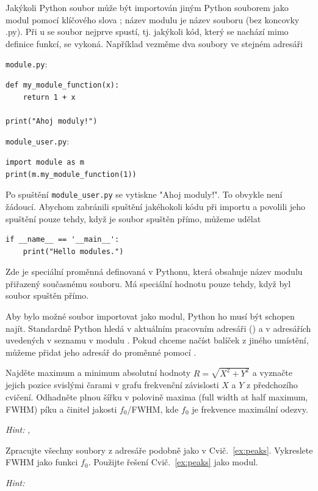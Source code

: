 \begin{syntax}
    Jakýkoli Python soubor může být importován jiným Python souborem jako modul pomocí klíčového slova ; název modulu je název souboru (bez koncovky .py). Při u se soubor nejprve spustí, tj. jakýkoli kód, který se nachází mimo definice funkcí, se vykoná. Například vezměme dva soubory ve stejném adresáři

    \verb|module.py|:
\begin{lstlisting}
def my_module_function(x):
    return 1 + x

print("Ahoj moduly!")
\end{lstlisting}

    \verb|module_user.py|:
\begin{lstlisting}
import module as m
print(m.my_module_function(1))
\end{lstlisting}

    Po spuštění \verb|module_user.py| se vytiskne "Ahoj moduly!". To obvykle není žádoucí. Abychom zabránili spuštění jakéhokoli kódu při importu a povolili jeho spuštění pouze tehdy, když je soubor spuštěn přímo, můžeme udělat
\begin{lstlisting}
if __name__ == '__main__':
    print("Hello modules.")
\end{lstlisting}
    Zde je  speciální proměnná definovaná v Pythonu, která obsahuje název modulu přiřazený současnému souboru. Má speciální hodnotu  pouze tehdy, když byl soubor spuštěn přímo.

    Aby bylo možné soubor importovat jako modul, Python ho musí být schopen najít. Standardně Python hledá v aktuálním pracovním adresáři () a v adresářích uvedených v seznamu  v modulu . Pokud chceme načíst balíček z jiného umístění, můžeme přidat jeho adresář do proměnné  pomocí .
\end{syntax}
\begin{exercise}
    \label{ex:peaks}
    Najděte maximum a minimum absolutní hodnoty $R = \sqrt{X^2 + Y^2}$ a vyznačte jejich pozice svislými čarami v grafu frekvenční závislosti $X$ a $Y$ z předchozího cvičení. Odhadněte plnou šířku v polovině maxima (full width at half maximum, FWHM) píku a činitel jakosti $f_0$/FWHM, kde $f_0$ je frekvence maximální odezvy. 
    
    \emph{Hint:} , 
\end{exercise}
\begin{exercise}
    \label{ex:peaks-all}
    Zpracujte všechny soubory z adresáře  podobně jako v Cvič.~\ref{ex:peaks}. Vykreslete FWHM jako funkci $f_0$. Použijte řešení Cvič.~\ref{ex:peaks} jako modul.
    
    \emph{Hint:} 
\end{exercise}

